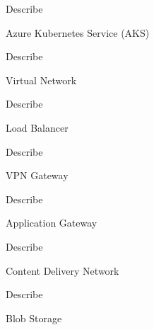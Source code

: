 \documentclass{scrartcl}
\newenvironment{flashcard}[2][]{%
    #1
    \vfill
    \centerline{\Large{#2}}
    \vfill
    \newpage
}
{\newpage}
\begin{document}
    \begin{flashcard}[Describe]{Azure Kubernetes Service (AKS)}

    \end{flashcard}

    \begin{flashcard}[Describe]{Virtual Network}

    \end{flashcard}

    \begin{flashcard}[Describe]{Load Balancer}

    \end{flashcard}

    \begin{flashcard}[Describe]{VPN Gateway}

    \end{flashcard}

    \begin{flashcard}[Describe]{Application Gateway}

    \end{flashcard}

    \begin{flashcard}[Describe]{Content Delivery Network}

    \end{flashcard}

    \begin{flashcard}[Describe]{Blob Storage}

    \end{flashcard}
\end{document}
